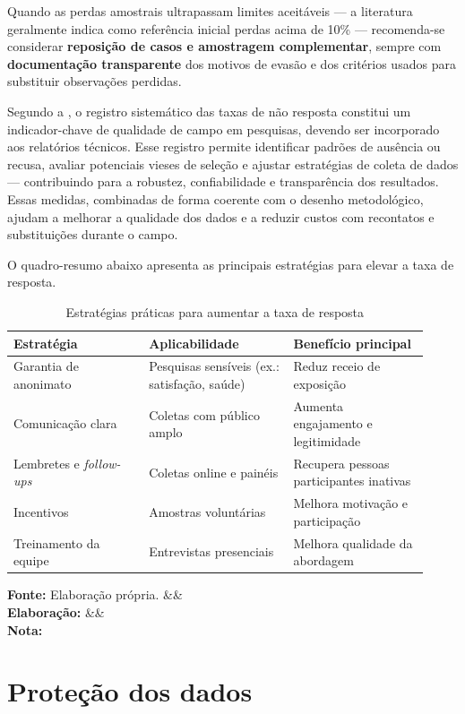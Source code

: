 \documentclass[12pt, a4paper, openany]{book}
\newcommand{\figmeta}[3]{%
  \par\vspace{4pt}%
  \begin{minipage}{\linewidth}%
  \footnotesize%
  \textbf{Fonte:} #1%
  \ifx&#2&\else\\\textbf{Elabora\c{c}\~ao:} #2\fi%
  \ifx&#3&\else\\\textbf{Nota:} #3\fi%
  \end{minipage}%
  \vspace{6pt}%
}
\begin{document}
Quando as perdas amostrais ultrapassam limites aceit\'aveis --- a literatura geralmente indica como refer\^encia inicial perdas acima de 10\% --- recomenda-se considerar \textbf{reposi\c{c}\~ao de casos e amostragem complementar}, sempre com \textbf{documenta\c{c}\~ao transparente} dos motivos de evas\~ao e dos crit\'erios usados para substituir observa\c{c}\~oes perdidas.

Segundo a \citet{oecd2022data}, o registro sistem\'atico das taxas de n\~ao resposta constitui um indicador-chave de qualidade de campo em pesquisas, devendo ser incorporado aos relat\'orios t\'ecnicos. Esse registro permite identificar padr\~oes de aus\^encia ou recusa, avaliar potenciais vieses de sele\c{c}\~ao e ajustar estrat\'egias de coleta de dados --- contribuindo para a robustez, confiabilidade e transpar\^encia dos resultados. Essas medidas, combinadas de forma coerente com o desenho metodol\'ogico, ajudam a melhorar a qualidade dos dados e a reduzir custos com recontatos e substitui\c{c}\~oes durante o campo.

O quadro-resumo abaixo apresenta as principais estrat\'egias para elevar a taxa de resposta.

\begin{table}[H]
\centering
\caption{Estrat\'egias pr\'aticas para aumentar a taxa de resposta}
\label{tab:taxa_resposta}
\begin{tabular}{p{0.30\linewidth} p{0.32\linewidth} p{0.30\linewidth}}
\toprule
\textbf{Estrat\'egia} & \textbf{Aplicabilidade} & \textbf{Benef\'icio principal} \\
\midrule
Garantia de anonimato & Pesquisas sens\'iveis (ex.: satisfa\c{c}\~ao, sa\'ude) & Reduz receio de exposi\c{c}\~ao \\
Comunica\c{c}\~ao clara & Coletas com p\'ublico amplo & Aumenta engajamento e legitimidade \\
Lembretes e \textit{follow-ups} & Coletas online e pain\'eis & Recupera pessoas participantes inativas \\
Incentivos & Amostras volunt\'arias & Melhora motiva\c{c}\~ao e participa\c{c}\~ao \\
Treinamento da equipe & Entrevistas presenciais & Melhora qualidade da abordagem \\
\bottomrule
\end{tabular}
\figmeta{Elabora\c{c}\~ao pr\'opria.}{}{}
\end{table}

\section{Prote\c{c}\~ao dos dados}
\end{document}
